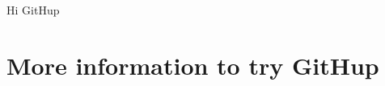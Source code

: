 \documentclass[a4paper,11pt]{report}
\begin{document}
Hi GitHup
\section{More information to try GitHup}
\end{document}
